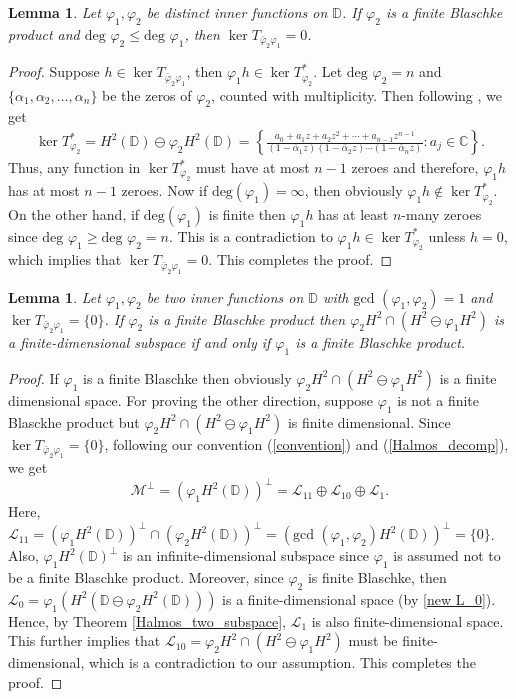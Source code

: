 \documentclass[12pt, a4 paper]{amsart}
\newcommand{\cll}{\mathcal{L}}
\newcommand{\clm}{\mathcal{M}}
\newcommand{\D}{\mathbb{D}}
\theoremstyle{definition}
\theoremstyle{plain}
\newtheorem{lem}[thm]{Lemma}
\theoremstyle{definition}
\numberwithin{equation}{section}
\let\phi=\varphi
\begin{document}
\begin{lem}\label{zeroes}
Let $\phi_1, \phi_2$ be distinct inner functions on $\D$.  If $\phi_2$ is a finite Blaschke product and $\mbox{deg } \phi_2 \leq \mbox{deg }\phi_1$, then $\ker T_{\bar \phi_2 \phi_1} = 0$.
\end{lem}
\begin{proof}
Suppose $h\in \ker T_{\bar\phi_2\phi_1}$, then $\phi_1 h \in \ker T_{\phi_2}^*$. Let $\mbox{deg }\phi_2 = n$ and $\{\alpha_1,\alpha_2,\ldots,\alpha_n\}$ be the zeros of  $\phi_2$, counted with multiplicity. Then following \cite[Corollary 5.18]{GMR},  we get     
\begin{align*} 
                 \ker T_{\phi_2}^* = H^2(\mathbb{D})\ominus \phi_2 H^2(\mathbb{D})=\left\{\frac{a_0+a_1z+a_2z^2+\cdots+a_{n-1}z^{n-1}}{(1-\bar\alpha_1z)(1-\bar\alpha_2z)\cdots(1-\bar\alpha_nz)}:a_j\in\mathbb{C}\right\}.
\end{align*} 
Thus, any function in $\ker T_{\phi_2}^*$ must have at most $n-1$ zeroes and therefore, $\phi_1 h$ has at most $n-1$ zeroes. Now if $\mbox{deg}(\phi_1)=\infty$, then obviously $\phi_1h\notin \ker T^*_{\phi_2}.$ On the other hand, if $\mbox{deg}(\phi_1)$ is finite then $\phi_1 h$ has at least $n$-many zeroes since $\mbox{deg }\phi_1 \geq \mbox{deg }\phi_2=n$. This is a contradiction to $\phi_1 h \in \ker T_{\phi_2}^*$ unless $h=0$, which implies that $\ker T_{\bar \phi_2 \phi_1} = 0$.  This completes the proof.
\end{proof}
 {\begin{lem}\label{phi1,phi2 finite}
Let $\phi_1,\phi_2$ be two inner functions on $\D$ with $\mbox{gcd }(\phi_1,\phi_2)=1$ and $\ker T_{\bar\phi_2\phi_1}=\{0\}$. If $\phi_2$ is a finite Blaschke product then $\phi_2H^2\cap (H^2\ominus \phi_1 H^2)$ is a finite-dimensional subspace if and only if $\phi_1$ is a finite Blaschke product. 
\end{lem}
\begin{proof}
If $\phi_1$ is a finite Blaschke then obviously $\phi_2H^2\cap (H^2\ominus \phi_1 H^2)$ is a finite dimensional space. For proving the other direction, suppose $\phi_1$ is not a finite Blasckhe product but $\phi_2H^2\cap (H^2\ominus \phi_1 H^2)$ is finite dimensional. Since $\ker T_{\bar\phi_2\phi_1}=\{0\}$, following our convention (\ref{convention}) and (\ref{Halmos_decomp}), we get
\[
\clm^{\perp} = (\phi_1 H^2(\mathbb{D}))^\perp=\cll_{11} \oplus \cll_{10} \oplus \cll_1.
\]
Here, $\cll_{11}=(\phi_1H^2(\mathbb{D}))^\perp\cap(\phi_2H^2(\mathbb{D}))^\perp = (\mbox{gcd }(\phi_1, \phi_2) H^2(\mathbb{D}))^\perp  = \{0\}$. Also, $\phi_1H^2(\mathbb{D})^\perp$ is an infinite-dimensional subspace since $\phi_1$ is assumed not to be a finite Blaschke product. Moreover, since $\phi_2$ is finite Blaschke, then $\cll_0=\phi_1(H^2(\mathbb{D}\ominus \phi_2H^2(\mathbb{D})))$ is a finite-dimensional space (by \ref{new L_0}). Hence, by Theorem \ref{Halmos_two_subspace}, $\cll_1$ is also finite-dimensional space. This further implies that $\cll_{10}=\phi_2H^2\cap (H^2\ominus \phi_1 H^2)$ must be finite-dimensional, which is a contradiction to our assumption. This completes the proof.
\end{proof}}
\end{document}
